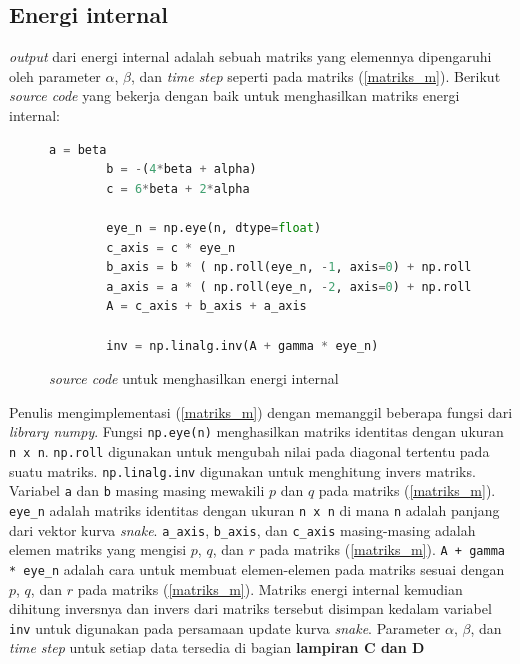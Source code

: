 \subsection{Energi internal}
\emph{output} dari energi internal adalah sebuah matriks yang elemennya dipengaruhi oleh parameter $\alpha$, $\beta$, dan \emph{time step} seperti pada matriks (\ref{matriks_m}). Berikut \emph{source code} yang bekerja dengan baik untuk menghasilkan matriks energi internal:
\begin{figure}[H]
	\begin{lstlisting}[language=Python, basicstyle=\tiny]
		a = beta
		b = -(4*beta + alpha)
		c = 6*beta + 2*alpha
		
		eye_n = np.eye(n, dtype=float)
		c_axis = c * eye_n
		b_axis = b * ( np.roll(eye_n, -1, axis=0) + np.roll(eye_n, -1, axis=1) )
		a_axis = a * ( np.roll(eye_n, -2, axis=0) + np.roll(eye_n, -2, axis=1) )
		A = c_axis + b_axis + a_axis
		
		inv = np.linalg.inv(A + gamma * eye_n)
	\end{lstlisting}
	\caption{\emph{source code} untuk menghasilkan energi internal}
	\label{code:energy_internal}
\end{figure}
Penulis mengimplementasi (\ref{matriks_m}) dengan memanggil beberapa fungsi dari \emph{library numpy}. Fungsi \texttt{np.eye(n)} menghasilkan matriks identitas dengan ukuran \texttt{n x n}. \texttt{np.roll} digunakan untuk mengubah nilai pada diagonal tertentu pada suatu matriks. \texttt{np.linalg.inv} digunakan untuk menghitung invers matriks. Variabel \texttt{a} dan \texttt{b} masing masing mewakili $p$ dan $q$ pada matriks (\ref{matriks_m}). \texttt{eye\_n} adalah matriks identitas dengan ukuran \texttt{n x n} di mana \texttt{n} adalah panjang dari vektor kurva \emph{snake}. \texttt{a\_axis}, \texttt{b\_axis}, dan \texttt{c\_axis} masing-masing adalah elemen matriks yang mengisi $p$, $q$, dan $r$ pada matriks (\ref{matriks_m}). \texttt{A + gamma * eye\_n} adalah cara untuk membuat elemen-elemen pada matriks sesuai dengan $p$, $q$, dan $r$ pada matriks (\ref{matriks_m}). Matriks energi internal kemudian dihitung inversnya dan invers dari matriks tersebut disimpan kedalam variabel \texttt{inv} untuk digunakan pada persamaan update kurva \emph{snake}. Parameter $\alpha$, $\beta$, dan \emph{time step} untuk setiap data tersedia di bagian \textbf{lampiran C dan D}


